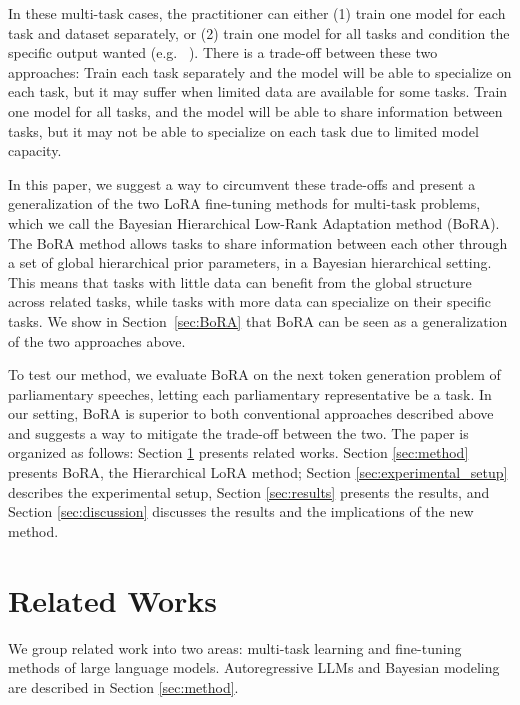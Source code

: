 \documentclass[fullpaper]{nldl}
\begin{document}
In these multi-task cases, the practitioner can either (1) train one model for each task and dataset separately, or (2) train one model for all tasks and condition the specific output wanted (e.g. ~\cite{Raffel2019}).
There is a trade-off between these two approaches: Train each task separately and the model will be able to specialize on each task, but it may suffer when limited data are available for some tasks. 
Train one model for all tasks, and the model will be able to share information between tasks, but it may not be able to specialize on each task due to limited model capacity.

In this paper, we suggest a way to circumvent these trade-offs and present a generalization of the two LoRA fine-tuning methods for multi-task problems, which we call the Bayesian Hierarchical Low-Rank Adaptation method (BoRA).
The BoRA method allows tasks to share information between each other through a set of global hierarchical prior parameters, in a Bayesian hierarchical setting. 
This means that tasks with little data can benefit from the global structure across related tasks, while tasks with more data can specialize on their specific tasks.
We show in Section~\ref{sec:BoRA} that BoRA can be seen as a generalization of the two approaches above.

To test our method, we evaluate BoRA on the next token generation problem of parliamentary speeches, letting each parliamentary representative be a task. 
In our setting, BoRA is superior to both conventional approaches described above and suggests a way to mitigate the trade-off between the two.
The paper is organized as follows: Section \ref{sec:related_works} presents related works. 
Section \ref{sec:method} presents BoRA, the Hierarchical LoRA method; Section \ref{sec:experimental_setup} describes the experimental setup, Section \ref{sec:results} presents the results, and Section \ref{sec:discussion} discusses the results and the implications of the new method.



\section{Related Works} \label{sec:related_works}
We group related work into two areas: multi-task learning and fine-tuning methods of large language models. 
Autoregressive LLMs and Bayesian modeling are described in Section \ref{sec:method}.
\end{document}
